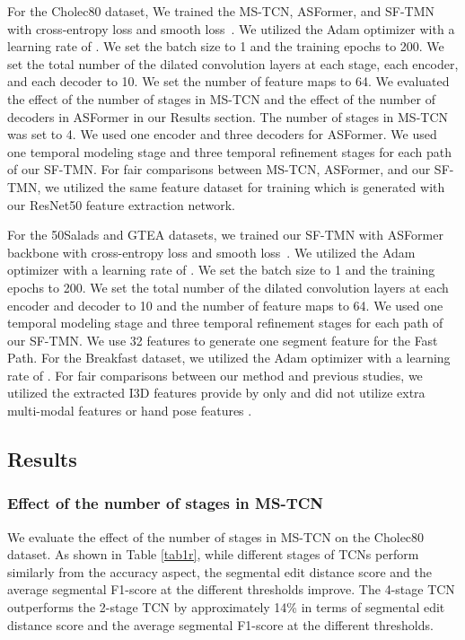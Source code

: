 \documentclass[sn-mathphys,Numbered]{sn-jnl}
\theoremstyle{thmstyleone}\newtheorem{theorem}{Theorem}\newtheorem{proposition}[theorem]{Proposition}
\theoremstyle{thmstyletwo}\newtheorem{example}{Example}\newtheorem{remark}{Remark}
\theoremstyle{thmstylethree}\newtheorem{definition}{Definition}
\begin{document}
For the Cholec80 dataset, We trained the MS-TCN, ASFormer, and SF-TMN with cross-entropy loss and smooth loss~\cite{farha2019ms}. We utilized the Adam optimizer with a learning rate of . We set the batch size to 1 and the training epochs to 200. We set the total number of the dilated convolution layers at each stage, each encoder, and each decoder to 10. We set the number of feature maps to 64. We evaluated the effect of the number of stages in MS-TCN and the effect of the number of decoders in ASFormer in our Results section. The number of stages in MS-TCN was set to 4. We used one encoder and three decoders for ASFormer. We used one temporal modeling stage and three temporal refinement stages for each path of our SF-TMN. For fair comparisons between MS-TCN, ASFormer, and our SF-TMN, we utilized the same feature dataset for training which is generated with our ResNet50 feature extraction network.

For the 50Salads and GTEA datasets, we trained our SF-TMN with ASFormer backbone with cross-entropy loss and smooth loss~\cite{farha2019ms}. We utilized the Adam optimizer with a learning rate of . We set the batch size to 1 and the training epochs to 200. We set the total number of the dilated convolution layers at each encoder and decoder to 10 and the number of feature maps to 64. We used one temporal modeling stage and three temporal refinement stages for each path of our SF-TMN. We use 32 features to generate one segment feature for the Fast Path. For the Breakfast dataset, we utilized the Adam optimizer with a learning rate of . For fair comparisons between our method and previous studies, we utilized the extracted I3D features provide by \cite{farha2019ms} only and did not utilize extra multi-modal features \cite{li2022bridge, van2023aspnet} or hand pose features \cite{ishihara2022mcfm}.

\subsection{Results}


\subsubsection{Effect of the number of stages in MS-TCN}

We evaluate the effect of the number of stages in MS-TCN on the Cholec80 dataset. As shown in Table \ref{tab1r}, while different stages of TCNs perform similarly from the accuracy aspect,  the segmental edit distance score and the average segmental F1-score at the different thresholds improve. The 4-stage TCN outperforms the 2-stage TCN by approximately 14\% in terms of segmental edit distance score and the average segmental F1-score at the different thresholds. 
\end{document}
